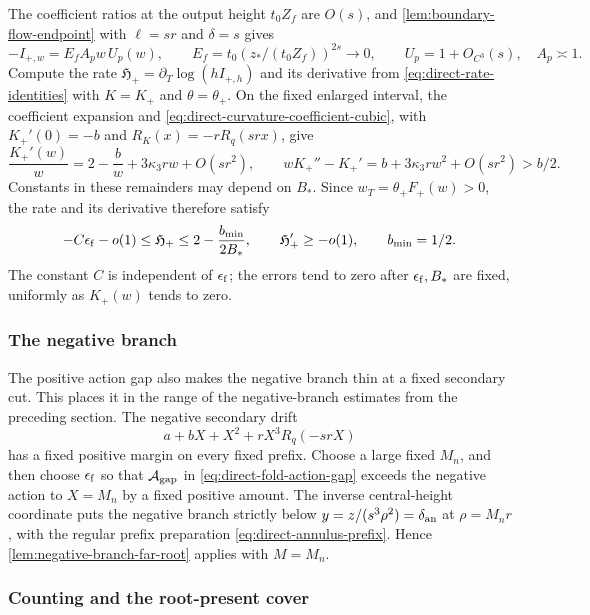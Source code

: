 The coefficient ratios at the output height \(t_0Z_f\) are
\(O(s)\), and \cref{lem:boundary-flow-endpoint} with \(\ell=sr\)
and \(\delta=s\) gives
\begin{equation}
\label{eq:direct-fold-endpoint}
 -I_{+,w}=E_f A_pw\,U_p(w),\qquad
 E_f=t_0(z_*/(t_0Z_f))^{2s}\longrightarrow0,\qquad
 U_p=1+O_{C^3}(s),\quad A_p\asymp1.
\end{equation}
Compute the rate \(\mathfrak H_+=\partial_T\log(hI_{+,h})\) and its
derivative from \eqref{eq:direct-rate-identities} with \(K=K_+\) and
\(\theta=\theta_+\).
On the fixed enlarged interval, the coefficient expansion and
\eqref{eq:direct-curvature-coefficient-cubic}, with \(K_+'(0)=-b\) and
\(R_K(x)=-rR_q(srx)\), give
\[
 \frac{K_+'(w)}w=2-\frac bw+3\kappa_3 rw+O(sr^2),\qquad
 wK_+''-K_+'=b+3\kappa_3 rw^2+O(sr^2)>b/2 .
\]
Constants in these remainders may depend on \(B_*\).
Since \(w_T=\theta_+F_+(w)>0\), the rate and its derivative
therefore satisfy
\begin{equation}
\label{eq:direct-fold-positive-rates}
 -C\epsilon_{\rm f}-o(1)\le\mathfrak H_+
       \le 2-\frac{b_{\min}}{2B_*},\qquad
 \mathfrak H_+'\ge-o(1),\qquad b_{\min}=1/2 .
\end{equation}
The constant \(C\) is independent of \(\epsilon_{\rm f}\); the errors tend to
zero after \(\epsilon_{\rm f},B_*\) are fixed, uniformly as \(K_+(w)\)
tends to zero.

\subsubsection{The negative branch}

The positive action gap also makes the negative branch thin at a
fixed secondary cut. This places it in the range of the negative-branch
estimates from the preceding section.
The negative secondary drift
\[
 a+bX+X^2+rX^3R_q(-srX)
\]
has a fixed positive margin on every fixed prefix.
Choose a large fixed \(M_n\), and then choose \(\epsilon_{\rm f}\) so
that \(\mathcal A_{\rm gap}\) in \eqref{eq:direct-fold-action-gap} exceeds
the negative action to \(X=M_n\) by a fixed positive amount.
The inverse central-height coordinate puts the negative
branch strictly below \(y=z/(s^3\rho^2)=\delta_{\rm an}\)
at \(\rho=M_nr\), with the regular prefix preparation
\eqref{eq:direct-annulus-prefix}. Hence
\cref{lem:negative-branch-far-root} applies with \(M=M_n\).

\subsubsection{Counting and the root-present cover}

